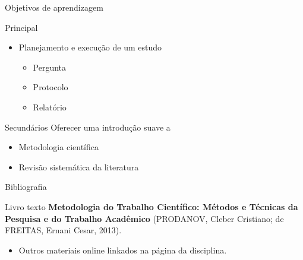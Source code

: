 \documentclass{beamer}
\begin{document}
\begin{frame}[label=objetivo]{Objetivos de aprendizagem}
  \begin{block}{Principal}
    \begin{itemize}
      \large
    \item Planejamento e execução de um estudo
      \begin{itemize}
      \item Pergunta
      \item Protocolo
      \item Relatório
      \end{itemize}
    \end{itemize}
  \end{block}
  \bigskip
  \bigskip
  \begin{block}{Secundários}
    \small
    Oferecer uma introdução suave a
    \begin{itemize}
    \item Metodologia científica
    \item Revisão sistemática da literatura
    \end{itemize}
  \end{block}
\end{frame}

\begin{frame}{Bibliografia}
  \begin{block}{Livro texto}
    {\bf Metodologia do Trabalho Científico: Métodos e Técnicas da Pesquisa e do Trabalho Acadêmico} (PRODANOV, Cleber Cristiano; de FREITAS, Ernani Cesar, 2013).
  \end{block}
  \begin{itemize}
  \item Outros materiais online linkados na página da disciplina.
  \end{itemize}
\end{frame}
\end{document}
